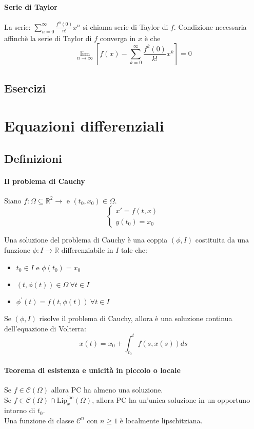\documentclass[a4paper,12pt]{article}
\newcommand{\cont}{\mathscr{C}}
\begin{document}
\paragraph{Serie di Taylor}
La serie:
$\displaystyle \sum_{n=0}^\infty \frac{f^{n}(0)}{n!} x^n$ si chiama serie di Taylor di $f$. Condizione necessaria affinchè la serie di Taylor di $f$ converga in  $x$ è che $$\lim_{n \to \infty}\displaystyle \left[ f(x) - \displaystyle  \sum_{k=0}^\infty \frac{f^{k}(0)}{k!}x^k \right] = 0 $$
\subsection{Esercizi}

\section{Equazioni differenziali}

\subsection{Definizioni}
\paragraph{Il problema di Cauchy}
Siano $f:\Omega \subseteq \mathbb{R}^2 \longrightarrow $ e $ \left(t_0,x_0\right) \in \Omega.$ 
$$\label{PC}\begin{cases} x'=f\left(t,x\right) \\ y\left(t_0\right)=x_0 \end{cases}$$

Una soluzione del problema di Cauchy è una coppia $\left( \phi , I \right)$ costituita da una funzione $\phi: I \longrightarrow \mathbb{R}$ differenziabile in $I$ tale che:
\begin{itemize}
\item $t_0 \in I$ e $ \phi\left(t_0\right)=x_0$
\item $ \left(t,\phi\left(t\right)\right) \in \Omega \ \forall t \in I$
\item $ \phi^{'}\left(t \right) = f\left(t,\phi\left(t\right)\right)\ \forall t \in I$
\end{itemize}

Se $\left(\phi,I\right)$ risolve il problema di Cauchy, allora è una soluzione continua dell'equazione di Volterra:
$$ x\left(t\right) = x_0 + \displaystyle\int^t_{t_0} f\left(s,x\left(s\right)\right) ds $$

\paragraph{Teorema di esistenza e unicità in piccolo o locale}
Se $f \in \cont \left(\Omega\right)$ allora PC ha almeno una soluzione. \\
Se $f \in \cont \left(\Omega\right) \cap \text{Lip}^{\text{loc}}_x\left(\Omega\right)$, allora PC ha un'unica soluzione in un opportuno intorno di $t_0$.\\
Una funzione di classe $\cont^n$ con $ n \geq 1 $ è localmente lipschitziana. 
\end{document}
